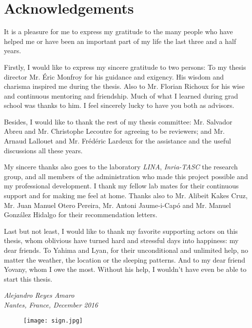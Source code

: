 \cleardoublepage
\chapter{Acknowledgements}
\vspace*{1cm}
It is a pleasure for me to express my gratitude to the many people who have helped me or have been an important part of my life the last three and a half years.

Firstly, I would like to express my sincere gratitude to two persons: To my thesis director Mr. Éric {\sc Monfroy} for his guidance and exigency. His wisdom and charisma inspired me during the thesis. Also to Mr. Florian {\sc Richoux} for his wise and continuous mentoring and friendship. Much of what I learned during grad school was thanks to him. I feel sincerely lucky to have you both as advisors.

Besides, I would like to thank the rest of my thesis committee: Mr. Salvador {\sc Abreu} and Mr. Christophe {\sc Lecoutre} for agreeing to be reviewers; and Mr. Arnaud {\sc Lallouet} and Mr. Frédéric {\sc Lardeux} for the assistance and the useful discussions all these years.

My sincere thanks also goes to the laboratory \emph{LINA}, \emph{Inria-TASC} the research group, and all members of the administration who made this project possible and my professional development. I thank my fellow lab mates for their continuous support and for making me feel at home. Thanks also to Mr. Alibeit {\sc Kakes Cruz}, Mr. Juan Manuel {\sc Otero Pereira}, Mr. Antoni {\sc Jaume-i-Capó} and Mr. Manuel {\sc González Hidalgo} for their recommendation letters.

Last but not least, I would like to thank my favorite supporting actors on this thesis, whom oblivious have turned hard and stressful days into happiness: my dear friends. To Yahima and Lyan, for their unconditional and unlimited help, no matter the weather, the location or the sleeping patterns. And to my dear friend Yovany, whom I owe the most. Without his help, I wouldn't have even be able to start this thesis.


\vspace*{1cm}
\begin{center}
\emph{
Alejandro {\sc Reyes Amaro}\\
\vspace*{0.1 cm}
Nantes, France, December 2016}
\begin{figure}[!h]
\centering
\texttt{[image: sign.jpg]}
\end{figure}
\end{center}
